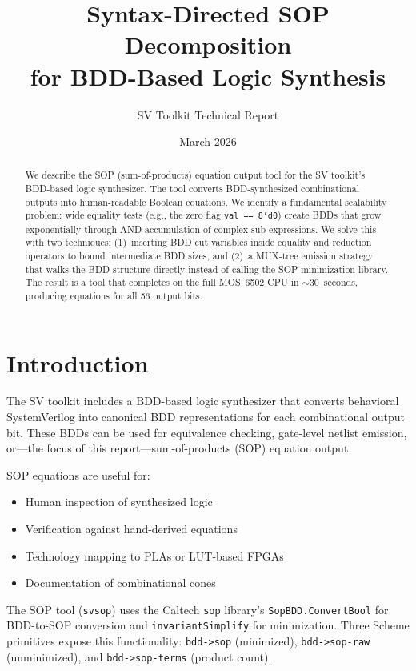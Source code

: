 \documentclass[11pt]{article}
\title{Syntax-Directed SOP Decomposition\\
       for BDD-Based Logic Synthesis}
\author{SV Toolkit Technical Report}
\date{March 2026}
\begin{document}
\maketitle

\begin{abstract}
We describe the SOP (sum-of-products) equation output tool for the SV
toolkit's BDD-based logic synthesizer.  The tool converts
BDD-synthesized combinational outputs into human-readable Boolean
equations.  We identify a fundamental scalability problem: wide
equality tests (e.g., the zero flag \texttt{val == 8'd0}) create BDDs
that grow exponentially through AND-accumulation of complex sub-expressions.
We solve this with two techniques: (1)~inserting BDD cut
variables inside equality and reduction operators to bound intermediate
BDD sizes, and (2)~a MUX-tree emission strategy that walks the BDD
structure directly instead of calling the SOP minimization library.
The result is a tool that completes on the full MOS~6502 CPU in
${\sim}30$~seconds, producing equations for all 56 output bits.
\end{abstract}

\section{Introduction}

The SV toolkit includes a BDD-based logic synthesizer that converts
behavioral SystemVerilog into canonical BDD representations for each
combinational output bit.  These BDDs can be used for equivalence
checking, gate-level netlist emission, or---the focus of this
report---sum-of-products (SOP) equation output.

SOP equations are useful for:
\begin{itemize}
\item Human inspection of synthesized logic
\item Verification against hand-derived equations
\item Technology mapping to PLAs or LUT-based FPGAs
\item Documentation of combinational cones
\end{itemize}

The SOP tool (\texttt{svsop}) uses the Caltech \texttt{sop} library's
\texttt{SopBDD.ConvertBool} for BDD-to-SOP conversion and
\texttt{invariantSimplify} for minimization.  Three Scheme primitives
expose this functionality: \texttt{bdd->sop} (minimized),
\texttt{bdd->sop-raw} (unminimized), and \texttt{bdd->sop-terms}
(product count).
\end{document}
